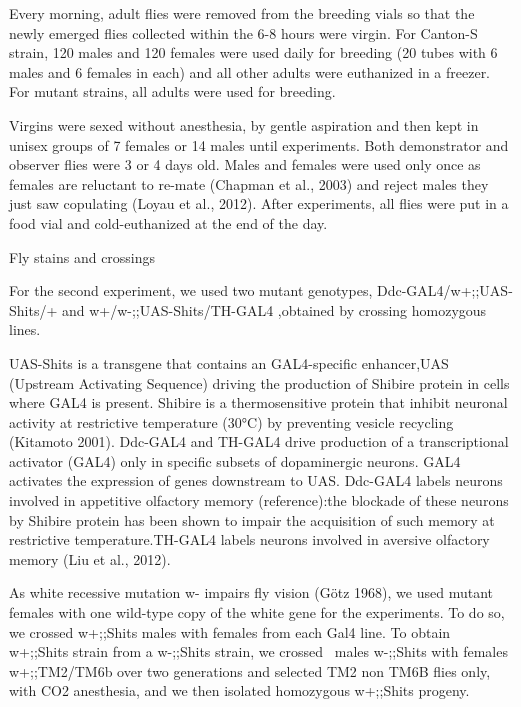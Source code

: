 \documentclass{article}
\begin{document}
Every morning, adult flies were removed from the breeding vials so that the newly emerged flies collected within the 6-8 hours were virgin. For Canton-S strain, 120 males and 120 females were used daily for breeding (20 tubes with 6 males and 6 females in each) and all other adults were euthanized in a freezer. For mutant strains, all adults were used for breeding. 

Virgins were sexed without anesthesia, by gentle aspiration and then kept in unisex groups of 7 females or 14 males until experiments. Both demonstrator and observer flies were 3 or 4 days old. Males and females were used only once as females are reluctant to re-mate (Chapman et al., 2003) and reject males they just saw copulating (Loyau et al., 2012). After experiments, all flies were put in a food vial and cold-euthanized at the end of the day.


\bigskip


\bigskip

Fly stains and crossings


\bigskip

For the second experiment, we used two mutant genotypes, Ddc-GAL4/w+;;UAS-Shits/+ and w+/w{}-;;UAS-Shits/TH-GAL4 ,obtained by crossing homozygous lines. 

UAS-Shits is a transgene that contains an GAL4-specific enhancer,UAS (Upstream Activating Sequence) driving the production of Shibire protein in cells where GAL4 is present. Shibire is a thermosensitive protein that inhibit neuronal activity at restrictive temperature (30°C) by preventing vesicle recycling (Kitamoto 2001). Ddc-GAL4 and TH-GAL4 drive production of a transcriptional activator (GAL4) only in specific subsets of dopaminergic neurons. GAL4 activates the expression of genes downstream to UAS. Ddc-GAL4 labels neurons involved in appetitive olfactory memory (reference):the blockade of these neurons by Shibire protein has been shown to impair the acquisition of such memory at restrictive temperature.TH-GAL4 labels neurons involved in aversive olfactory memory (Liu et al., 2012).

As white recessive mutation w- impairs fly vision (Götz 1968), we used mutant females with one wild-type copy of the white gene for the experiments. To do so, we crossed w+;;Shits males with females from each Gal4 line. To obtain w+;;Shits strain from a w-;;Shits strain, we crossed \ males w-;;Shits with females w+;;TM2/TM6b over two generations and selected TM2 non TM6B flies only, with CO2 anesthesia, and we then isolated homozygous w+;;Shits progeny.
\end{document}
